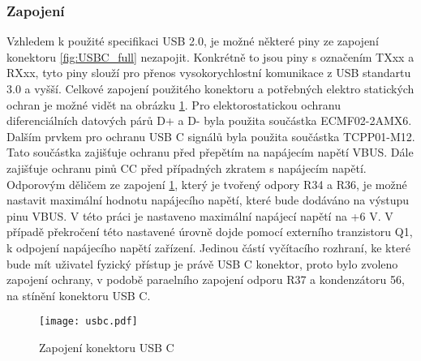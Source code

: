 	\subsubsection{Zapojení}
	Vzhledem k použité specifikaci USB 2.0, je možné některé piny ze zapojení konektoru \ref{fig:USBC_full} nezapojit. Konkrétně to jsou piny s označením TXxx a RXxx, tyto piny slouží pro přenos vysokorychlostní komunikace z USB standartu 3.0 a vyšší. Celkové zapojení použitého konektoru a potřebných elektro statických ochran je možné vidět na obrázku \ref{fig:USBC_zapojeni}. Pro elektorostatickou ochranu diferenciálních datových párů D+ a D- byla použita součástka ECMF02-2AMX6. Dalším prvkem pro ochranu USB C signálů byla použita součástka TCPP01-M12. Tato součástka zajišťuje ochranu před přepětím na napájecím napětí VBUS. Dále zajišťuje ochranu pinů CC před případných zkratem s napájecím napětí. Odporovým děličem ze zapojení \ref{fig:USBC_zapojeni}, který je tvořený odpory R34 a R36, je možné nastavit maximální hodnotu napájecího napětí, které bude dodáváno na výstupu pinu VBUS. V této práci je nastaveno maximální napájecí napětí na +6 V. V případě překročení této nastavené úrovně dojde pomocí externího tranzistoru Q1, k odpojení napájecího napětí zařízení. Jedinou částí vyčítacího rozhraní, ke které bude mít uživatel fyzický přístup je právě USB C konektor, proto bylo zvoleno zapojení ochrany, v podobě paraelního zapojení odporu R37 a kondenzátoru 56, na stínění konektoru USB C. 
	\begin{figure}[h!]
		\centering
		\captionsetup{justification=centering}
		\texttt{[image: usbc.pdf]}
		\caption{Zapojení konektoru USB C} 
		\label{fig:USBC_zapojeni}
	\end{figure} 
	
